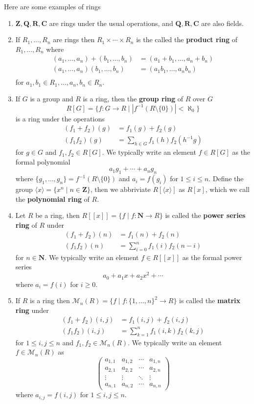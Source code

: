 \documentclass[11pt]{book}
\newcommand{\env}[2]{\begin{#1}#2\end{#1}}
\begin{document}
\begin{example}Here are some examples of rings
\env{enumerate}{
	\item $\mathbf{Z},\mathbf{Q},\mathbf{R},\mathbf{C}$ are rings under the usual operations, and $\mathbf{Q},\mathbf{R},\mathbf{C}$ are also fields.
	\item If $R_1,\dots,R_n$ are rings then $R_1\times \cdots\times R_n$ is the called the \textbf{product ring} of $R_1,\dots,R_n$ where
	\[\begin{aligned}
	(a_1,\dots,a_n)+(b_1,\dots,b_n)&=(a_1+b_1,\dots,a_n+b_n)\\
	(a_1,\dots,a_n)(b_1,\dots,b_n)&=(a_1b_1,\dots,a_nb_n)\\
	\end{aligned}\]
	for $a_1,b_1\in R_1, \dots, a_n,b_n\in R_n$. 
	\item If $G$ is a group and $R$ is a ring, then the \textbf{group ring} of $R$ over $G$
	\[
	R[G]=\{f:G\rightarrow R\mid |f^{-1}(R\setminus\{0\})|<\aleph_0 \}\]
	is a ring under the operations 
	\[\begin{aligned}
	(f_1+f_2)(g)&=f_1(g)+f_2(g)\\
	(f_1f_2)(g)&=\sum_{h\in G}f_1(h)f_2(h^{-1}g)
	\end{aligned}\]
	for $g\in G$ and $f_1,f_2\in R[G]$. We typically write an element $f\in R[G]$ as the formal polynomial 
	\[a_1g_1+\cdots +a_ng_n\]
	where $\{g_1,\dots,g_n\}=f^{-1}(R\setminus\{0\})$ and $a_i=f(g_i)$ for $1\le i\le n$. Define the group $\langle x\rangle=\{x^n\mid n\in\mathbf{Z}\}$, then we abbriviate $R[\langle x\rangle]$ as $R[x]$, which we call the \textbf{polynomial ring} of $R$.
	\item Let $R$ be a ring, then $R[[x]]=\{f\mid f:\mathbf{N}\rightarrow R\}$ is called the \textbf{power series ring} of $R$ under 
	\[\begin{aligned}
	(f_1+f_2)(n)&=f_1(n)+f_2(n)\\
	(f_1f_2)(n)&=\sum_{i=0}^nf_1(i)f_2(n-i)
	\end{aligned}\]
	for $n\in \mathbf{N}$. We typically write an element $f\in R[[x]]$ as the formal power series
	\[a_0+a_1x+a_2x^2+\cdots\]
	where $a_i=f(i)$ for $i\ge 0$.
	\item If $R$ is a ring then $\mathcal{M}_n(R)=\{f\mid f:\{1,\dots,n\}^2\rightarrow R\}$ is called the \textbf{matrix ring} under 
	\[\begin{aligned}
	(f_1+f_2)(i,j)&=f_1(i,j)+f_2(i,j)\\
	(f_1f_2)(i,j)&=\sum_{k=1}^n f_1(i,k)f_2(k,j)
	\end{aligned}\]
	for $1\le i,j\le n$ and $f_1,f_2\in \mathcal{M}_n(R)$. We typically write an element $f\in \mathcal{M}_n(R)$ as 
	\[\begin{pmatrix}
	a_{1,1}&a_{1,2}&\cdots& a_{1,n}\\
	a_{2,1}&a_{2,2}&\cdots& a_{2,n}\\
	\vdots &\vdots&\ddots&\vdots\\
	a_{n,1}&a_{n,2}&\cdots &a_{n,n}
	\end{pmatrix}\]
	where $a_{i,j}=f(i,j)$ for $1\le i,j\le n$.
}
\end{example}
\end{document}
